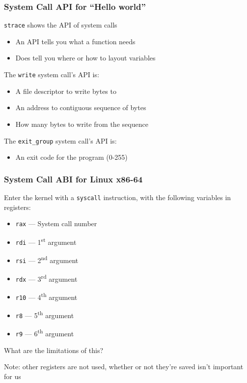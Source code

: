 \documentclass[aspectratio=169]{beamer}
\begin{document}
  \begin{frame}
    \frametitle{System Call API for ``Hello world''}

    \texttt{strace} shows the API of system calls

    \begin{itemize}
      \item An API tells you what a function needs
      \item Does  tell you where or how to layout variables
    \end{itemize}

    \vspace{1em}

    The \texttt{write} system call's API is:
    \begin{itemize}
      \item A file descriptor to write bytes to
      \item An address to contiguous sequence of bytes
      \item How many bytes to write from the sequence
    \end{itemize}
    
    \vspace{1em}

    The \texttt{exit\_group} system call's API is:
    \begin{itemize}
      \item An exit code for the program (0-255)
    \end{itemize}
  \end{frame}

  \begin{frame}
    \frametitle{System Call ABI for Linux x86-64}

    Enter the kernel with a \texttt{syscall} instruction, with the following
    variables in registers:

    \begin{itemize}
      \item \texttt{rax} --- System call number
      \item \texttt{rdi} --- 1\textsuperscript{st} argument
      \item \texttt{rsi} --- 2\textsuperscript{nd} argument
      \item \texttt{rdx} --- 3\textsuperscript{rd} argument
      \item \texttt{r10} --- 4\textsuperscript{th} argument
      \item \texttt{r8} --- 5\textsuperscript{th} argument
      \item \texttt{r9} --- 6\textsuperscript{th} argument
    \end{itemize}

    What are the limitations of this?

    \vspace{2em}

    Note: other registers are not used, whether or not they're saved isn't
    important for us
  \end{frame}
\end{document}

